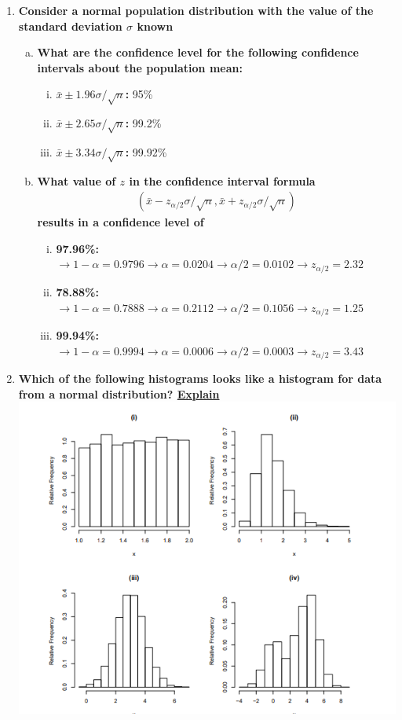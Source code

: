 \documentclass{article}
\begin{document}
\begin{enumerate}[1.]
\item
\textbf{Consider a normal population distribution with the value of the standard deviation $\sigma$ known}
\begin{enumerate}[(a)]
\item
\textbf{What are the confidence level for the following confidence intervals about the population mean:}
\begin{enumerate}[(i)]
  \item \textbf{$\bar{x} \pm 1.96\sigma/\sqrt{n}$: } 95\%
  \item \textbf{$\bar{x} \pm 2.65\sigma/\sqrt{n}$: } 99.2\%
  \item \textbf{$\bar{x} \pm 3.34\sigma/\sqrt{n}$: } 99.92\%
\end{enumerate}

\item
\textbf{What value of $z$ in the confidence interval formula }
\begin{gather*}
(\bar{x} - z_{\alpha/2}\sigma/\sqrt{n}, \bar{x} + z_{\alpha/2}\sigma/\sqrt{n} )
\end{gather*}
\textbf{results in a confidence level of}

\begin{enumerate}[(i)]
  \item \textbf{97.96\%: } $\to 1 - \alpha = 0.9796 \to \alpha = 0.0204 \to \alpha / 2 = 0.0102 \to z_{\alpha/2} =  2.32$
  \item \textbf{78.88\%: } $\to 1 - \alpha = 0.7888 \to \alpha = 0.2112 \to \alpha / 2 = 0.1056 \to z_{\alpha/2} = 1.25$
  \item \textbf{99.94\%: } $\to 1 - \alpha = 0.9994 \to \alpha = 0.0006 \to \alpha / 2 = 0.0003 \to z_{\alpha/2} = 3.43$
\end{enumerate}
\end{enumerate}

\item
\textbf{Which of the following histograms looks like a histogram for data from a normal distribution? \underline{Explain}}
\includegraphics{graphs}


\end{enumerate}
\end{document}
